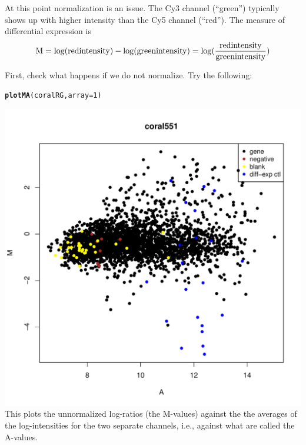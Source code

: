\documentclass[a4paper,9pt]{article}\usepackage[]{graphicx}\usepackage[]{xcolor}
\makeatletter
\def\maxwidth{ %
  \ifdim\Gin@nat@width>\linewidth
    \linewidth
  \else
    \Gin@nat@width
  \fi
}
\newcommand{\hlnum}[1]{\textcolor[rgb]{0.686,0.059,0.569}{#1}}%
\newcommand{\hlstd}[1]{\textcolor[rgb]{0.345,0.345,0.345}{#1}}%
\newcommand{\hlkwc}[1]{\textcolor[rgb]{0.333,0.667,0.333}{#1}}%
\newcommand{\hlkwd}[1]{\textcolor[rgb]{0.737,0.353,0.396}{\textbf{#1}}}%
\newenvironment{kframe}{%
 \def\at@end@of@kframe{}%
 \ifinner\ifhmode%
  \def\at@end@of@kframe{\end{minipage}}%
  \begin{minipage}{\columnwidth}%
 \fi\fi%
 \def\FrameCommand##1{\hskip\@totalleftmargin \hskip-\fboxsep
 \colorbox{shadecolor}{##1}\hskip-\fboxsep
     \hskip-\linewidth \hskip-\@totalleftmargin \hskip\columnwidth}%
 \MakeFramed {\advance\hsize-\width
   \@totalleftmargin\z@ \linewidth\hsize
   \@setminipage}}%
 {\par\unskip\endMakeFramed%
 \at@end@of@kframe}
\newenvironment{knitrout}{}{} %
\makeatother
\begin{document}
At this point normalization is an issue.  The Cy3 channel (``green'')
typically shows up with higher intensity than the Cy5 channel
(``red'').  The measure of differential expression is\[
{\rm M} = \log({\rm red intensity}) - \log({\rm green intensity}) =
\log(\frac{\displaystyle \rm red intensity}
{\displaystyle \rm green intensity})
\]

First, check what happens if we do not normalize.
Try the following:
\begin{knitrout}
\color{fgcolor}\begin{kframe}
\begin{alltt}
\hlkwd{plotMA}\hlstd{(coralRG,} \hlkwc{array}\hlstd{=}\hlnum{1}\hlstd{)}
\end{alltt}
\end{kframe}
\includegraphics[width=\maxwidth]{figure/unnamed-chunk-7-1} 
\end{knitrout}
This plots the unnormalized log-ratios (the M-values) against the
the averages of the log-intensities for the two separate channels,
i.e., against what are called the A-values.
\end{document}
